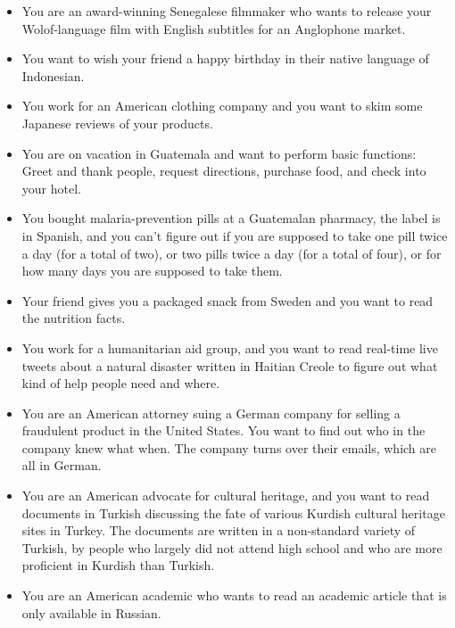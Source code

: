 \begin{itemize}

\item You are an award-winning Senegalese filmmaker who wants to release your Wolof-language film with English subtitles for an Anglophone market.

\item You want to wish your friend a happy birthday in their native language of Indonesian.

\item You work for an American clothing company and you want to skim some Japanese reviews of your products.

\item You are on vacation in Guatemala and want to perform basic functions: Greet and thank people, request directions, purchase food, and check into your hotel.

\item You bought malaria-prevention pills at a Guatemalan pharmacy, the label is in Spanish, and you can't figure out if you are supposed to take one pill twice a day (for a total of two), or two pills twice a day (for a total of four), or for how many days you are supposed to take them.

\item Your friend gives you a packaged snack from Sweden and you want to read the nutrition facts.

\item You work for a humanitarian aid group, and you want to read real-time live tweets about a natural disaster written in Haitian Creole to figure out what kind of help people need and where.

\item You are an American attorney suing a German company for selling a fraudulent product in the United States.  You want to find out who in the company knew what when.  The company turns over their emails, which are all in German.

\item You are an American advocate for cultural heritage, and you want to read documents in Turkish discussing the fate of various Kurdish cultural heritage sites in Turkey.  The documents are written in a non-standard variety of Turkish, by people who largely did not attend high school and who are more proficient in Kurdish than Turkish.

\item You are an American academic who wants to read an academic article that is only available in Russian.


\end{itemize}
